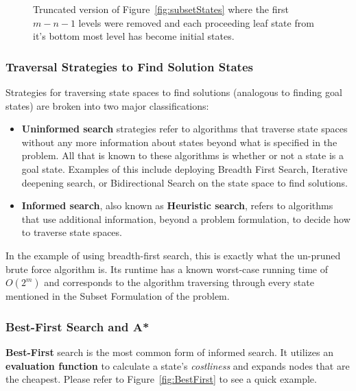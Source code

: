 \begin{figure}


    \caption{Truncated version of Figure~\ref{fig:subsetStates} where the first $m-n-1$ levels were removed and each proceeding leaf state from it's bottom most level has become initial states. }
    \label{fig:truncatedStates}
\end{figure}    


\subsubsection{Traversal Strategies to Find Solution States}

Strategies for traversing state spaces to find solutions (analogous to finding goal states) are broken into two major classifications: 
\begin{itemize}
    \item \textbf{Uninformed search} strategies refer to algorithms that traverse state spaces without any more information about states beyond what is specified in the problem. All that is known to these algorithms is whether or not a state is a goal state.  Examples of this include deploying Breadth First Search, Iterative deepening search, or Bidirectional Search on the state space to find solutions.
    \item \textbf{Informed search}, also known as \textbf{Heuristic search}, refers to algorithms that use additional information, beyond a problem formulation, to decide how to traverse state spaces. 
\end{itemize}

\noindent In the example of using breadth-first search, this is exactly what the un-pruned brute force algorithm is. Its runtime has a known worst-case running time of $O(2^m)$ and corresponds to the algorithm traversing through every state mentioned in the Subset Formulation of the problem. 


\subsubsection{Best-First Search and A*}

\textbf{Best-First} search is the most common form of informed search.
It utilizes an \textbf{evaluation function} to calculate a state's
\textit{costliness} and expands nodes that are the cheapest. Please refer to Figure~\ref{fig:BestFirst}
 to see a quick example.

